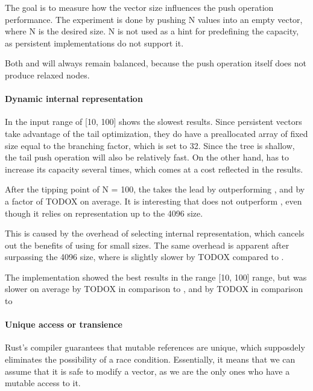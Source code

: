 The goal is to measure how the vector size influences the push operation performance. The experiment is done by pushing N values into an empty vector, where N is the desired size. N is not used as a hint for predefining the capacity, as persistent implementations do not support it. 

Both \rrbvec{} and \pvec{} will always remain balanced, because the push operation itself does not produce relaxed nodes.


\paragraph{Dynamic internal representation}
In the input range of [10, 100] \stdvec{} shows the slowest results. Since persistent vectors take advantage of the tail optimization, they do have a preallocated array of fixed size equal to the branching factor, which is set to 32. Since the tree is shallow, the tail push operation will also be relatively fast. On the other hand, \stdvec{} has to increase its capacity several times, which comes at a cost reflected in the results. 

After the tipping point of N = 100, the \stdvec{} takes the lead by outperforming \pvec{}, \rrbvec{} and \imrsvec{} by a factor of TODOX on average. It is interesting that \pvec{} does not outperform \rrbvec{}, even though it relies on \stdvec{} representation up to the 4096 size. 

This is caused by the overhead of selecting internal representation, which cancels out the benefits of using \stdvec{} for small sizes. The same overhead is apparent after surpassing the 4096 size, where \pvec{} is slightly slower by TODOX compared to \rrbvec{}. 

The \imrsvec{} implementation showed the best results in the range [10, 100] range, but was slower on average by TODOX in comparison to \pvec{}, and by TODOX in comparison to \stdvec{}

\paragraph{Unique access or transience}
Rust's compiler guarantees that mutable references are unique, which supposdely eliminates the possibility of a race condition. Essentially, it means that we can assume that it is safe to modify a vector, as we are the only ones who have a mutable access to it. 

